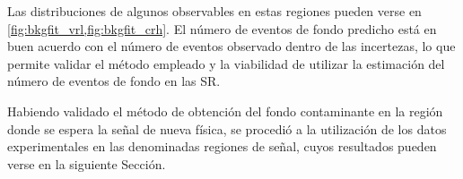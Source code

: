 Las distribuciones de algunos observables en estas regiones pueden verse en
\cref{fig:bkgfit_vrl,fig:bkgfit_crh}. El número de eventos de fondo predicho
est\'a en buen acuerdo con el número de eventos observado dentro de las
incertezas, lo que permite validar el método empleado y la viabilidad de
utilizar la estimación del número de eventos de fondo en las SR.

Habiendo validado el método de obtención del fondo contaminante en la región
donde se espera la señal de nueva física, se procedió a la utilización de los
datos experimentales en las denominadas regiones de señal, cuyos resultados
pueden verse en la siguiente Sección.






\begin{table}[!htbp]

  \caption{Resultados del ajuste en las VR correspondientes a {\SRL}.
    El número de eventos observado es comparado con el número de eventos esperado de fondo, después de la correspondiente
    normalización en las CR. Las incertezas incluyen la incerteza estadística y sistemática.}
  \label{tab:fit_result_vrl1}

  

\end{table}


\begin{table}[!htbp]

  \caption{Resultados del ajuste en las VR correspondientes a {\SRL}.
    El número de eventos observado es comparado con el número de eventos esperado de fondo, despues de la correspondiente
    normalizacion en las CR. Las incertezas incluyen la incerteza estadistica y sistematica.}
  \label{tab:fit_result_vrl2}

  

\end{table}


